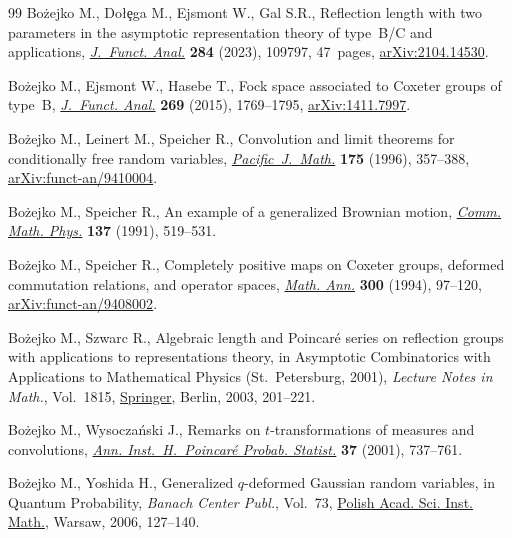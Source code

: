 \documentclass[pdftex]{sigma}
\numberwithin{equation}{section}
\begin{document}
\begin{thebibliography}{99}
Bo\.zejko M., Do{\l}\c{e}ga M., Ejsmont W., Gal S.R., Reflection length with
 two parameters in the asymptotic representation theory of type~{B}/{C} and
 applications, \href{https://doi.org/10.1016/j.jfa.2022.109797}{\textit{J.~Funct. Anal.}} \textbf{284} (2023), 109797, 47~pages,
 \href{https://arxiv.org/abs/2104.14530}{arXiv:2104.14530}.

Bo\.zejko M., Ejsmont W., Hasebe T., Fock space associated to {C}oxeter groups
 of type~{B}, \href{https://doi.org/10.1016/j.jfa.2015.06.026}{\textit{J.~Funct. Anal.}} \textbf{269} (2015), 1769--1795,
 \href{https://arxiv.org/abs/1411.7997}{arXiv:1411.7997}.

Bo\.zejko M., Leinert M., Speicher R., Convolution and limit theorems for
 conditionally free random variables, \href{https://doi.org/10.2140/pjm.1996.175.357}{\textit{Pacific~J.~Math.}} \textbf{175}
 (1996), 357--388, \href{https://arxiv.org/abs/funct-an/9410004}{arXiv:funct-an/9410004}.

Bo\.zejko M., Speicher R., An example of a generalized {B}rownian motion,
 \href{https://doi.org/10.1007/BF02100275}{\textit{Comm. Math. Phys.}} \textbf{137} (1991), 519--531.

Bo\.zejko M., Speicher R., Completely positive maps on {C}oxeter groups,
 deformed commutation relations, and operator spaces, \href{https://doi.org/10.1007/BF01450478}{\textit{Math. Ann.}}
 \textbf{300} (1994), 97--120, \href{https://arxiv.org/abs/funct-an/9408002}{arXiv:funct-an/9408002}.

Bo\.zejko M., Szwarc R., Algebraic length and {P}oincar\'e series on reflection
 groups with applications to representations theory, in Asymptotic
 Combinatorics with Applications to Mathematical Physics ({S}t.~{P}etersburg,
 2001), \textit{Lecture Notes in Math.}, Vol.~1815, \href{https://doi.org/10.1007/3-540-44890-X_9}{Springer}, Berlin, 2003,
 201--221.

Bo\.zejko M., Wysocza\'nski J., Remarks on {$t$}-transformations of measures
 and convolutions, \href{https://doi.org/10.1016/S0246-0203(01)01084-6}{\textit{Ann. Inst.~H.~Poincar\'e Probab. Statist.}}
 \textbf{37} (2001), 737--761.

Bo\.zejko M., Yoshida H., Generalized {$q$}-deformed {G}aussian random
 variables, in Quantum Probability, \textit{Banach Center Publ.}, Vol.~73,
 \href{https://doi.org/10.4064/bc73-0-8}{Polish Acad. Sci. Inst. Math.}, Warsaw, 2006, 127--140.


\end{thebibliography}
\end{document}
